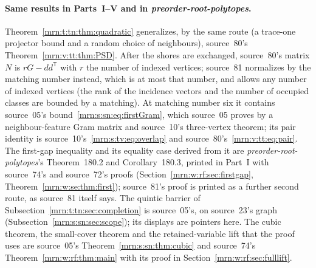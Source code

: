 \documentclass[11pt,a4paper]{article}
\theoremstyle{remark}\newtheorem{remark}[theorem]{Remark}
\newcommand{\prp}{\emph{preorder-root-polytopes}}
\begin{document}
\paragraph{Same results in Parts~I--V and in \prp.}
Theorem~\ref{mrn:t:tn:thm:quadratic} generalizes, by the same route (a
trace-one projector bound and a random choice of neighbours), source~80's
Theorem~\ref{mrn:v:tt:thm:PSD}. After the shores are exchanged, source~80's
matrix $N$ is $rG-dd^{\mathsf T}$ with $r$ the number of indexed vertices;
source~81 normalizes by the matching number instead, which is at most that
number, and allows any number of indexed vertices (the rank of the incidence
vectors and the number of occupied classes are bounded by a matching). At
matching number six it contains source~05's
bound~\eqref{mrn:s:sn:eq:firstGram}, which source~05 proves by a
neighbour-feature Gram matrix and source~10's three-vertex theorem; its pair
identity is source~10's~\eqref{mrn:s:tv:eq:overlap} and
source~80's~\eqref{mrn:v:tt:eq:pair}. The first-gap inequality and its
equality case derived from it are \prp's Theorem~180.2 and Corollary~180.3,
printed in Part~I with source~74's and source~72's proofs
(Section~\ref{mrn:w:rf:sec:firstgap}, Theorem~\ref{mrn:w:se:thm:first});
source~81's proof is printed as a further second route, as source~81 itself
says. The quintic barrier of Subsection~\ref{mrn:t:tn:sec:completion} is
source~05's, on source~23's graph (Subsection~\ref{mrn:s:sn:sec:scope}); its
displays are pointers here. The cubic theorem, the small-cover theorem and the
retained-variable lift that the proof uses are source~05's
Theorem~\ref{mrn:s:sn:thm:cubic} and source~74's
Theorem~\ref{mrn:w:rf:thm:main} with its proof in
Section~\ref{mrn:w:rf:sec:fulllift}.
\end{document}
